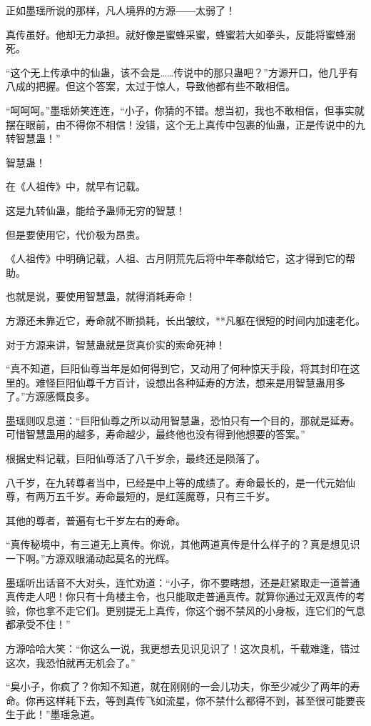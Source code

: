 \begin{this_body}
正如墨瑶所说的那样，凡人境界的方源――太弱了！

真传虽好。他却无力承担。就好像是蜜蜂采蜜，蜂蜜若大如拳头，反能将蜜蜂溺死。

“这个无上传承中的仙蛊，该不会是……传说中的那只蛊吧？”方源开口，他几乎有八成的把握。但这个答案，太过于惊人，导致他都有些不敢相信。

“呵呵呵。”墨瑶娇笑连连，“小子，你猜的不错。想当初，我也不敢相信，但事实就摆在眼前，由不得你不相信！没错，这个无上真传中包裹的仙蛊，正是传说中的九转智慧蛊！”

智慧蛊！

在《人祖传》中，就早有记载。

这是九转仙蛊，能给予蛊师无穷的智慧！

但是要使用它，代价极为昂贵。

《人祖传》中明确记载，人祖、古月阴荒先后将中年奉献给它，这才得到它的帮助。

也就是说，要使用智慧蛊，就得消耗寿命！

方源还未靠近它，寿命就不断损耗，长出皱纹，**凡躯在很短的时间内加速老化。

对于方源来讲，智慧蛊就是货真价实的索命死神！

“真不知道，巨阳仙尊当年是如何得到它，又动用了何种惊天手段，将其封印在这里的。难怪巨阳仙尊千方百计，设想出各种延寿的方法，想来是用智慧蛊用多了。”方源感慨良多。

墨瑶则叹息道：“巨阳仙尊之所以动用智慧蛊，恐怕只有一个目的，那就是延寿。可惜智慧蛊用的越多，寿命越少，最终他也没有得到他想要的答案。”

根据史料记载，巨阳仙尊活了八千岁余，最终还是陨落了。

八千岁，在九转尊者当中，已经是中上等的成绩了。寿命最长的，是一代元始仙尊，有两万五千岁。寿命最短的，是红莲魔尊，只有三千岁。

其他的尊者，普遍有七千岁左右的寿命。

“真传秘境中，有三道无上真传。你说，其他两道真传是什么样子的？真是想见识一下啊。”方源双眼涌动起莫名的光辉。

墨瑶听出话音不大对头，连忙劝道：“小子，你不要瞎想，还是赶紧取走一道普通真传走人吧！你只有十角楼主令，也只能取走普通真传。就算你通过无双真传的考验，你也拿不走它们。更别提无上真传，你这个弱不禁风的小身板，连它们的气息都承受不住！”

方源哈哈大笑：“你这么一说，我更想去见识见识了！这次良机，千载难逢，错过这次，我恐怕就再无机会了。”

“臭小子，你疯了？你知不知道，就在刚刚的一会儿功夫，你至少减少了两年的寿命。你再这样耗下去，等到真传飞如流星，你不禁什么都得不到，甚至很可能要丧生于此！”墨瑶急道。


\end{this_body}
